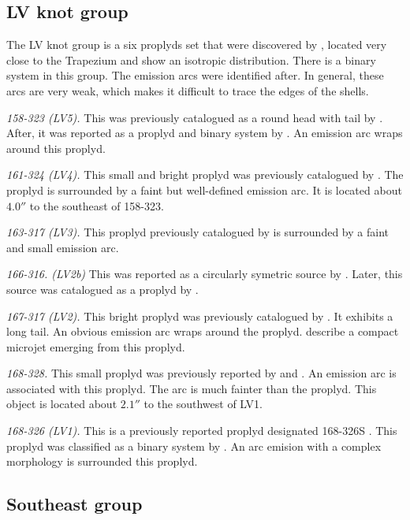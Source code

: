 \documentclass[apj, twocolumn]{aastex63}
\renewcommand\clearpage{}
\begin{document}
\subsection{LV knot group}
\label{sec:lv-group}



The LV knot group is a six proplyds set that were discovered by
\citet{Laques:1979a}, located very close to the Trapezium and show
an isotropic distribution. There is a binary system in this group.
The emission arcs were identified after. In general, these arcs
are very weak, which makes it difficult to trace the edges of the
shells.

\textit{158-323 (LV5).} This was previously catalogued as a round
head with tail by \citet{ODell:1996a}. After, it was reported
as a proplyd and binary system by \citep{Ricci:2008a}. An emission
arc wraps around this proplyd. 
 
\textit{161-324 (LV4).} This small and bright proplyd was
previously catalogued by \citet{ODell:1996a, Ricci:2008a}. The
proplyd is surrounded by a faint but well-defined emission arc.
It is located about \(4.0''\) to the southeast of 158-323.

\textit{163-317 (LV3).} This proplyd previously catalogued by
\citet{ODell:1996a, Ricci:2008a} is surrounded by a faint and
small emission arc. 

\textit{166-316. (LV2b)} This was reported as a circularly symetric
source by \citet{ODell:1996a}. Later, this source was catalogued as
a proplyd by \citet{Ricci:2008a}. 

\textit{167-317 (LV2).} This bright proplyd was previously catalogued
by \citet{ODell:1994a, Ricci:2008a}. It exhibits a long tail. An
obvious emission arc \citep{Bally:2000a} wraps around the proplyd.
\citet{Bally:2000a} describe a compact microjet emerging from this
proplyd. 

\textit{168-328.} This small proplyd was previously reported
by \citet{ODell:1994a} and \citet{Ricci:2008a}. An emission arc is
associated with this proplyd. The arc is much fainter than the
proplyd. This object is located about \(2.1''\) to the southwest
of LV1.  

\textit{168-326 (LV1).} This is a previously reported proplyd
designated 168-326S \citep{ODell:1994a}. This proplyd was classified
as a binary system by \citet{Ricci:2008a}. An arc emision with a
complex morphology is surrounded this proplyd.


\clearpage
\subsection{Southeast group}
\label{sec:se-group}


\end{document}
